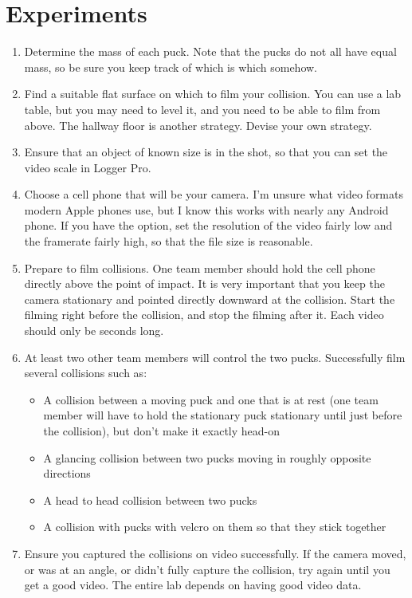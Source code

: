 \documentclass[10pt]{article}
\begin{document}
\section{Experiments}



\begin{enumerate}

\item	Determine the mass of each puck. Note that the pucks do not all have equal mass, so be sure you keep track of which is which somehow.
\item	Find a suitable flat surface on which to film your collision. You can use a lab table, but you may need to level it, and you need to be able to film from above. The hallway floor is another strategy. Devise your own strategy.
\item	Ensure that an object of known size is in the shot, so that you can set the video scale in Logger Pro.
\item	Choose a cell phone that will be your camera. I’m unsure what video formats modern Apple phones use, but I know this works with nearly any Android phone. If you have the option, set the resolution of the video fairly low and the framerate fairly high, so that the file size is reasonable.
\item	Prepare to film collisions. One team member should hold the cell phone directly above the point of impact. It is very important that you keep the camera stationary and pointed directly downward at the collision. Start the filming right before the collision, and stop the filming after it. Each video should only be seconds long.
\item	At least two other team members will control the two pucks. Successfully film several collisions such as:
\begin{itemize}
\item	A collision between a moving puck and one that is at rest (one team member will have to hold the stationary puck stationary until just before the collision), but don’t make it exactly head-on 
\item	A glancing collision between two pucks moving in roughly opposite directions
\item	A head to head collision between two pucks
\item     A collision with pucks with velcro on them so that they stick together
\end{itemize}
\item	Ensure you captured the collisions on video successfully. If the camera moved, or was at an angle, or didn’t fully capture the collision, try again until you get a good video. The entire lab depends on having good video data.

\end{enumerate}
\end{document}
